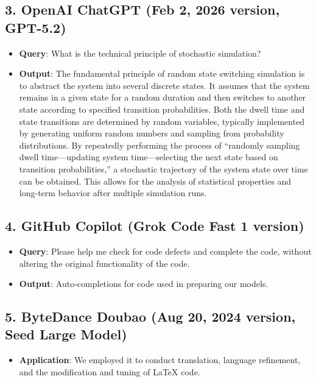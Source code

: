 \documentclass{mcmthesis}  %
\begin{document}
	\subsection*{3. OpenAI ChatGPT (Feb 2, 2026 version, GPT-5.2)}
	\begin{itemize}
		\item \textbf{Query}: What is the technical principle of stochastic simulation?
		\item \textbf{Output}: The fundamental principle of random state switching simulation is to abstract the system into several discrete states. It assumes that the system remains in a given state for a random duration and then switches to another state according to specified transition probabilities. Both the dwell time and state transitions are determined by random variables, typically implemented by generating uniform random numbers and sampling from probability distributions. By repeatedly performing the process of “randomly sampling dwell time—updating system time—selecting the next state based on transition probabilities,” a stochastic trajectory of the system state over time can be obtained. This allows for the analysis of statistical properties and long-term behavior after multiple simulation runs.
	\end{itemize}
	
	\subsection*{4. GitHub Copilot (Grok Code Fast 1 version)}
	\begin{itemize}
		\item \textbf{Query}: Please help me check for code defects and complete the code, without altering the original functionality of the code.
		\item \textbf{Output}: Auto‑completions for code used in preparing our models.
	\end{itemize}
	
	\subsection*{5. ByteDance Doubao (Aug 20, 2024 version, Seed Large Model)}
	\begin{itemize}
		\item \textbf{Application}: We employed it to conduct translation, language refinement, and the modification and tuning of LaTeX code.
	\end{itemize}
	
\end{document}
